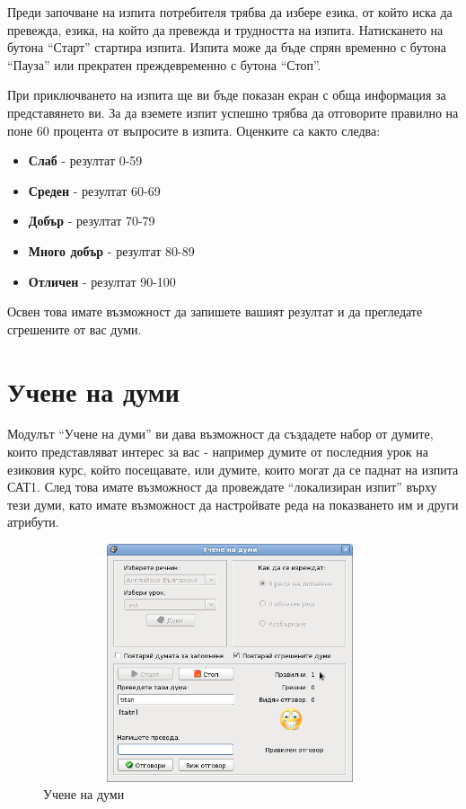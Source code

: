 Преди започване на изпита потребителя трябва да избере езика, от който
иска да превежда, езика, на който да превежда и трудността на
изпита. Натискането на бутона "`Старт"' стартира изпита. Изпита може
да бъде спрян временно с бутона "`Пауза"' или прекратен преждевременно
с бутона "`Стоп"'. 

При приключването на изпита ще ви бъде показан екран с обща информация
за представянето ви. За да вземете изпит успешно трябва да отговорите
правилно на поне 60 процента от въпросите в изпита. Оценките са както
следва:
\begin{itemize}
  \item \textbf{Слаб} - резултат 0-59
  \item \textbf{Среден} - резултат 60-69
  \item \textbf{Добър} - резултат 70-79
  \item \textbf{Много добър} - резултат 80-89
  \item \textbf{Отличен} - резултат 90-100
\end{itemize}

Освен това имате възможност да запишете вашият резултат и да
прегледате сгрешените от вас думи. 
\section{Учене на думи}
Модулът "`Учене на думи"' ви дава възможност да създадете набор от
думите, които представляват интерес за вас - например думите от
последния урок на езиковия курс, който посещавате, или думите, които
могат да се паднат на изпита САТ1. След това имате възможност да
провеждате "`локализиран изпит"' върху тези думи, като имате
възможност да настройвате реда на показването им и други атрибути.

\begin{figure}[htbp]
  \caption{Учене на думи}
  \centering
  \includegraphics[width=110mm, height=70mm]{images/study_words.png}
\end{figure}

